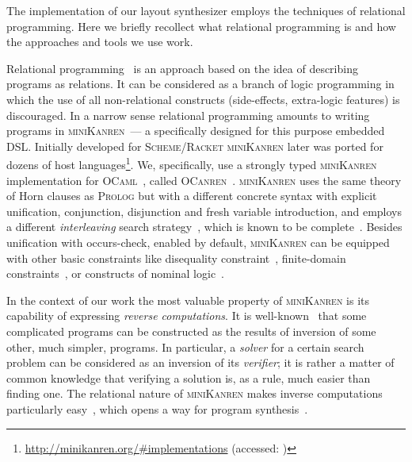 

The implementation of our layout synthesizer employs the techniques of relational programming. Here
we briefly recollect what relational programming is and how the approaches and tools we use work.

Relational programming~\cite{TRS} is an approach based on the idea of describing programs as relations. 
It can be considered as a branch of logic programming in which the use of
all non-relational constructs (side-effects, extra-logic features) is discouraged. 
In a narrow sense relational programming amounts to writing programs in \textsc{miniKanren}~--- a specifically designed for this purpose embedded DSL.
Initially developed for \textsc{Scheme}/\textsc{Racket}
\textsc{miniKanren} later was ported for dozens of host
languages\footnote{\url{http://minikanren.org/\#implementations} (accessed: )}.
We, specifically, use a strongly typed \textsc{miniKanren} implementation for \textsc{OCaml}~\cite{ocaml}, called \textsc{OCanren}~\cite{OCanren}.
\textsc{miniKanren} uses the same theory of Horn clauses as \textsc{Prolog} but with a different
concrete syntax with explicit unification, conjunction, disjunction and fresh variable introduction, and
employs a different \emph{interleaving} search strategy~\cite{interleaving}, which is known to be complete~\cite{certified}.
Besides unification with occurs-check, enabled by default, \textsc{miniKanren} can be equipped with other
basic constraints like disequality constraint~\cite{disuni}, finite-domain constraints~\cite{cKanren}, or
constructs of nominal logic~\cite{aKanren}.

In the context of our work the most valuable property of \textsc{miniKanren} is its capability of expressing \emph{reverse computations}.
It is well-known~\cite{SemanticsModifiers,SemanticsModifiers1} that some complicated programs can be constructed as
the results of inversion of some other, much simpler, programs. 
In particular, a \emph{solver} for a
certain search problem can be considered as an inversion of its \emph{verifier}; it is rather a matter of common knowledge that verifying a
solution is, as a rule, much easier than finding one. 
The relational nature of \textsc{miniKanren} makes
inverse computations particularly easy~\cite{searchproblems}, which opens a way for program
synthesis~\cite{Untagged,WBirdSeven,PatternMatching}.


